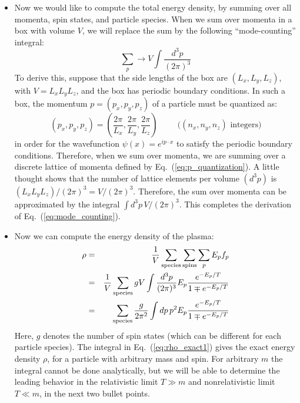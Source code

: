 \documentclass[aps,prd,superscriptaddress,groupedaddress,nofootinbib,nobibnotes]{revtex4}
\newcommand{\be}{\begin{equation}}
\newcommand{\ee}{\end{equation}}
\newcommand{\ba}{\begin{eqnarray}}
\newcommand{\ea}{\end{eqnarray}}
\newcommand{\nn}{\nonumber}
\begin{document}
\begin{itemize}
\item
Now we would like to compute the total energy density, by summing over all momenta, spin states, and particle species.
When we sum over momenta in a box with volume $V$, we will replace the sum by the following ``mode-counting'' integral:
\be
\sum_p \rightarrow V \int \frac{d^3p}{(2\pi)^3}  \label{eq:mode_counting}
\ee
To derive this, suppose that the side lengths of the box are $(L_x, L_y, L_z)$, with $V = L_x L_y L_z$,
and the box has periodic boundary conditions.
In such a box, the momentum $p = (p_x, p_y, p_z)$ of a particle must be quantized as:
\be
(p_x, p_y, p_z) = \left( \frac{2\pi}{L_x}, \frac{2\pi}{L_y}, \frac{2\pi}{L_z} \right)  \hspace{1cm} \mbox{($(n_x,n_y,n_z)$ integers)} \label{eq:p_quantization}
\ee
in order for the wavefunction $\psi(x) = e^{ip\cdot x}$ to satisfy the periodic boundary conditions.
Therefore, when we sum over momenta, we are summing over a discrete lattice of momenta defined by Eq.~(\ref{eq:p_quantization}).
A little thought shows that the number of lattice elements per volume $(d^3p)$ is $(L_xL_yL_z)/(2\pi)^3 = V/(2\pi)^3$.
Therefore, the sum over momenta can be approximated by the integral $\int d^3p \, V / (2\pi)^3$.
This completes the derivation of Eq.~(\ref{eq:mode_counting}).

\item
Now we can compute the energy density of the plasma:
\ba
\rho 
  &=& \frac{1}{V} \sum_{\rm species} \sum_{\rm spins} \sum_p E_p f_p \nn \\
  &=& \frac{1}{V} \sum_{\rm species} g V \int \frac{d^3 p}{(2\pi)^3} E_p \frac{e^{-E_p/T}}{1 \mp e^{-E_p/T}} \nn \\
  &=& \sum_{\rm species} \frac{g}{2\pi^2} \int dp \, p^2 E_p \frac{e^{-E_p/T}}{1 \mp e^{-E_p/T}}  \label{eq:rho_exact1}
\ea
Here, $g$ denotes the number of spin states (which can be different for each particle species).
The integral in Eq.~(\ref{eq:rho_exact1}) gives the exact energy density $\rho$, for a particle with
arbitrary mass and spin.  For arbitrary $m$ the integral cannot be done analytically, but we will
be able to determine the leading behavior in the relativistic limit $T \gg m$ and nonrelativistic
limit $T \ll m$, in the next two bullet points.


\end{itemize}
\end{document}
